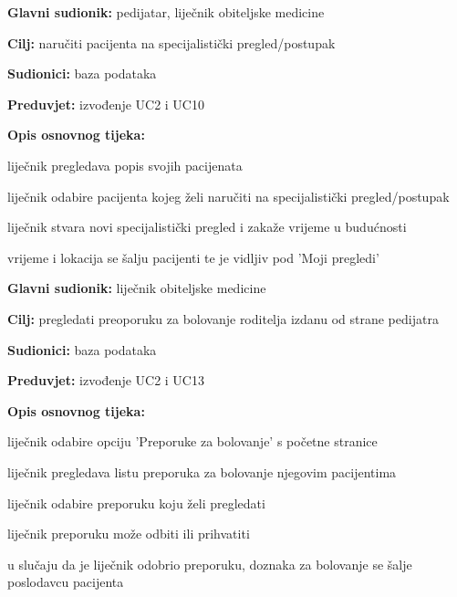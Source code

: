      
                    \noindent {}
					\begin{packed_item}
	
						\item \textbf{Glavni sudionik: }pedijatar, liječnik obiteljske medicine
						\item  \textbf{Cilj:} naručiti pacijenta na specijalistički pregled/postupak
						\item  \textbf{Sudionici:} baza podataka
						\item  \textbf{Preduvjet:} izvođenje UC2 i UC10
						\item  \textbf{Opis osnovnog tijeka:}
						
						\item[] \begin{packed_enum}
							
							\item liječnik pregledava popis svojih pacijenata
							\item liječnik odabire pacijenta kojeg želi naručiti na specijalistički pregled/postupak
							\item liječnik stvara novi specijalistički pregled i zakaže vrijeme u budućnosti
                            \item vrijeme i lokacija se šalju pacijenti te je vidljiv pod 'Moji pregledi'

						\end{packed_enum}
					\end{packed_item}


                     \noindent {}
					\begin{packed_item}
	
						\item \textbf{Glavni sudionik: }liječnik obiteljske medicine
						\item  \textbf{Cilj:} pregledati preoporuku za bolovanje roditelja izdanu od strane pedijatra
						\item  \textbf{Sudionici:} baza podataka
						\item  \textbf{Preduvjet:} izvođenje UC2 i UC13
						\item  \textbf{Opis osnovnog tijeka:}
						
						\item[] \begin{packed_enum}
							\item liječnik odabire opciju 'Preporuke za bolovanje' s početne stranice
							\item liječnik pregledava listu preporuka za bolovanje njegovim pacijentima
							\item liječnik odabire preporuku koju želi pregledati
							\item liječnik preporuku može odbiti ili prihvatiti
                            \item u slučaju da je liječnik odobrio preporuku, doznaka za bolovanje se šalje poslodavcu pacijenta

						\end{packed_enum}
					\end{packed_item}

